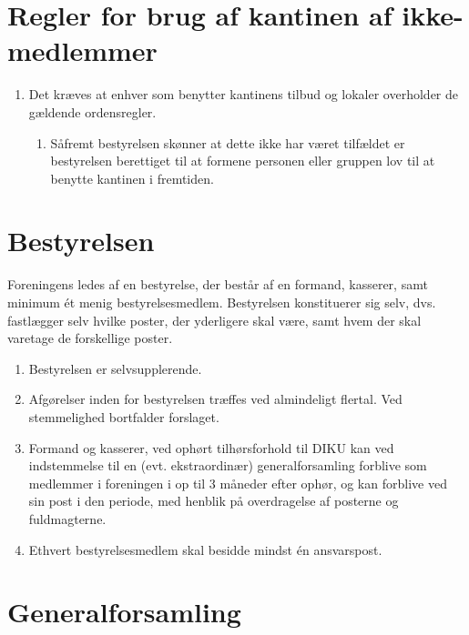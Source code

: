 \documentclass[a4paper, 10pt]{article}
\renewcommand\thesection{\textsection\arabic{section}}
\newenvironment{stykenum}{
  \begin{enumerate}[%
    label=Stk.~\arabic*., ref=\textsection~\theenumi~Stk.~\arabic*, start=1]
}{\end{enumerate}}
\newenvironment{substykenum}{
  \begin{enumerate}[%
          label=Stk.~\arabic{enumi}.\arabic*:,
      ref=\thesection~Stk.~\arabic{enumi}.\arabic*, start=1]
}{\end{enumerate}}
\begin{document}
\section{Regler for brug af kantinen af ikke-medlemmer}

\begin{stykenum}
\item Det kræves at enhver som benytter kantinens tilbud og lokaler
overholder de gældende ordensregler.
\begin{substykenum}
\item Såfremt bestyrelsen skønner at dette ikke har været tilfældet er
bestyrelsen berettiget til at formene personen eller gruppen lov til at benytte
kantinen i fremtiden.
\end{substykenum}
\end{stykenum}

\section{Bestyrelsen}


Foreningens ledes af en bestyrelse, der består af en formand,
kasserer, samt minimum ét menig bestyrelsesmedlem.
Bestyrelsen konstituerer sig selv, dvs. fastlægger selv hvilke poster,
der yderligere skal være, samt hvem der skal varetage de forskellige
poster.

\begin{stykenum}

\item Bestyrelsen er selvsupplerende.

\item Afgørelser inden for bestyrelsen træffes ved almindeligt flertal.
Ved stemmelighed bortfalder forslaget.



\item Formand og kasserer, ved ophørt tilhørsforhold til DIKU kan ved
indstemmelse til en (evt. ekstraordinær) generalforsamling forblive
som medlemmer i foreningen i op til 3 måneder efter ophør, og kan
forblive ved sin post i den periode, med henblik på overdragelse af
posterne og fuldmagterne.

\item Ethvert bestyrelsesmedlem skal besidde mindst én ansvarspost.

\end{stykenum}

\section{Generalforsamling}
\end{document}
